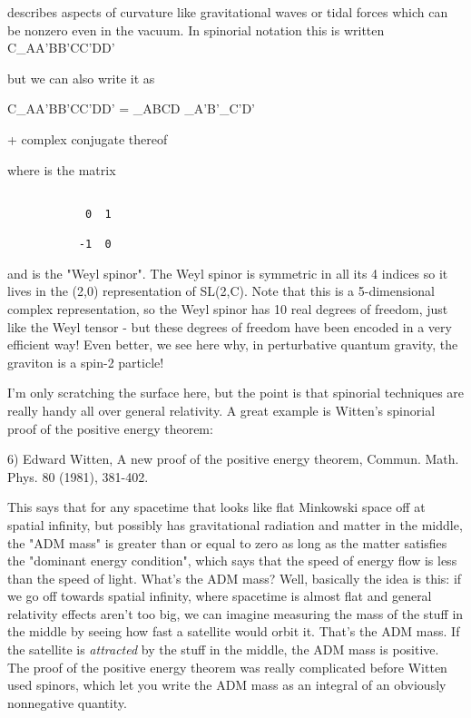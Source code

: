 describes aspects of curvature like gravitational waves or tidal forces
which can be nonzero even in the vacuum.  In spinorial notation this is
written 
C_{AA'BB'CC'DD'}

but we can also write it as

C_{AA'BB'CC'DD'}  =  \Phi _{ABCD} \epsilon _{A'B'}\epsilon _{C'D'}

                 + complex conjugate thereof
               
where \epsilon  is the matrix

\begin{verbatim}

            0  1

           -1  0
\end{verbatim}
    
and \Phi  is the "Weyl spinor".  The Weyl spinor is symmetric in all its 4
indices so it lives in the (2,0) representation of SL(2,C).  Note that 
this is a 5-dimensional complex representation, so the Weyl spinor has
10 real degrees of freedom, just like the Weyl tensor - but these 
degrees of freedom have been encoded in a very efficient way!  Even 
better, we see here why, in perturbative quantum gravity, the graviton 
is a spin-2 particle!

I'm only scratching the surface here, but the point is that spinorial
techniques are really handy all over general relativity.  A great
example is Witten's spinorial proof of the positive energy theorem:

6) Edward Witten, A new proof of the positive energy theorem,
Commun. Math. Phys. 80 (1981), 381-402. 

This says that for any spacetime that looks like flat Minkowski space
off at spatial infinity, but possibly has gravitational radiation and
matter in the middle, the "ADM mass" is greater than or equal to zero as
long as the matter satisfies the "dominant energy condition", which says
that the speed of energy flow is less than the speed of light.  What's
the ADM mass?  Well, basically the idea is this: if we go off towards
spatial infinity, where spacetime is almost flat and general relativity
effects aren't too big, we can imagine measuring the mass of the stuff
in the middle by seeing how fast a satellite would orbit it.  That's the
ADM mass.  If the satellite is \emph{attracted} by the stuff in the middle,
the ADM mass is positive.  The proof of the positive energy theorem was
really complicated before Witten used spinors, which let you write the
ADM mass as an integral of an obviously nonnegative quantity.


